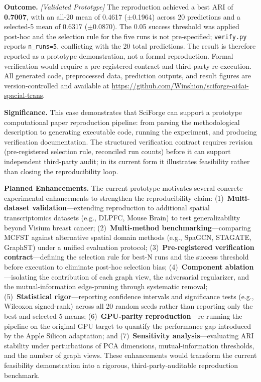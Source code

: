 \documentclass[sn-basic,Numbered,pdflatex]{sn-jnl}
\begin{document}
\textbf{Outcome.} \textit{[Validated Prototype]} The reproduction achieved a best ARI of \textbf{0.7007}, with an all-20 mean of 0.4617 ($\pm$0.1964) across 20 predictions and a selected-5 mean of 0.6317 ($\pm$0.0870). The 0.05 success threshold was applied post-hoc and the selection rule for the five runs is not pre-specified; \texttt{verify.py} reports \texttt{n\_runs=5}, conflicting with the 20 total predictions. The result is therefore reported as a prototype demonstration, not a formal reproduction. Formal verification would require a pre-registered contract and third-party re-execution. All generated code, preprocessed data, prediction outputs, and result figures are version-controlled and available at \url{https://github.com/Winshion/sciforge-ai4ai-spacial-trans}.

\textbf{Significance.} This case demonstrates that SciForge can support a prototype computational paper reproduction pipeline: from parsing the methodological description to generating executable code, running the experiment, and producing verification documentation. The structured verification contract requires revision (pre-registered selection rule, reconciled run counts) before it can support independent third-party audit; in its current form it illustrates feasibility rather than closing the reproducibility loop.


\textbf{Planned Enhancements.} The current prototype motivates several concrete experimental enhancements to strengthen the reproducibility claim: (1)~\textbf{Multi-dataset validation}---extending reproduction to additional spatial transcriptomics datasets (e.g., DLPFC, Mouse Brain) to test generalizability beyond Visium breast cancer; (2)~\textbf{Multi-method benchmarking}---comparing MCFST against alternative spatial domain methods (e.g., SpaGCN, STAGATE, GraphST) under a unified evaluation protocol; (3)~\textbf{Pre-registered verification contract}---defining the selection rule for best-N runs and the success threshold before execution to eliminate post-hoc selection bias; (4)~\textbf{Component ablation}---isolating the contribution of each graph view, the adversarial regularizer, and the mutual-information edge-pruning through systematic removal; (5)~\textbf{Statistical rigor}---reporting confidence intervals and significance tests (e.g., Wilcoxon signed-rank) across all 20 random seeds rather than reporting only the best and selected-5 means; (6)~\textbf{GPU-parity reproduction}---re-running the pipeline on the original GPU target to quantify the performance gap introduced by the Apple Silicon adaptation; and (7)~\textbf{Sensitivity analysis}---evaluating ARI stability under perturbations of PCA dimensions, mutual-information thresholds, and the number of graph views. These enhancements would transform the current feasibility demonstration into a rigorous, third-party-auditable reproduction benchmark.
\end{document}
